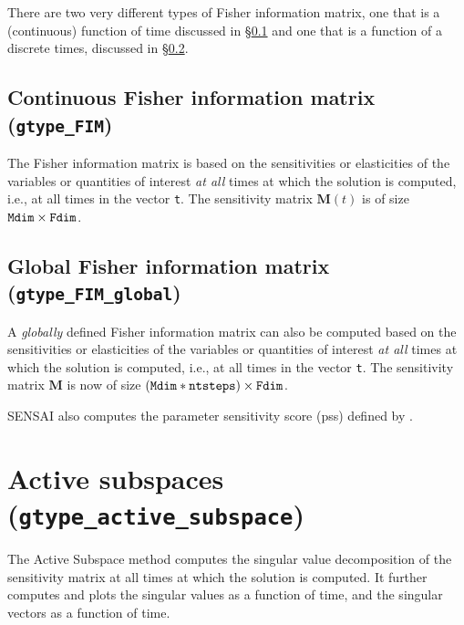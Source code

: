 \documentclass{siamltex}
\newcommand{\Mmat}{\bm{M}}
\newcommand{\Mdim}{{\tt Mdim}}
\newcommand{\Fdim}{{\tt Fdim}}
\newcommand{\ntsteps}{{\tt ntsteps}}
\begin{document}
There are two very different types of Fisher information matrix, one that is a (continuous) function of time discussed in \S \ref{sec:FIM_cts} and one that is a function of a discrete times, discussed in \S \ref{sec:FIM_global}. %



\subsection{Continuous Fisher information matrix ({\tt gtype\_FIM})}
\label{sec:FIM_cts}
The Fisher information matrix is based on the sensitivities or elasticities of the variables or quantities of interest \emph{at all} times at which the solution is computed, i.e., at all times in the vector {\tt t}. The sensitivity matrix $\Mmat(t)$ is of size $\Mdim\times\Fdim$.


\subsection{Global Fisher information matrix ({\tt gtype\_FIM\_global})}
\label{sec:FIM_global}
A \emph{globally} defined Fisher information matrix can also be computed based on the sensitivities or elasticities of the variables or quantities of interest \emph{at all} times at which the solution is computed, i.e., at all times in the vector {\tt t}.  The sensitivity matrix $\Mmat$ is now of size $(\Mdim*\ntsteps)\times\Fdim$.

\medskip
SENSAI also computes the parameter sensitivity score (pss) defined by \cite{CBCL-2009}.



\section{Active subspaces ({\tt gtype\_active\_subspace})}

The Active Subspace method computes the singular value decomposition of the sensitivity matrix at all times at which the solution is computed. It further computes and plots the singular values as a function of time, and the singular vectors as a function of time.
\end{document}
